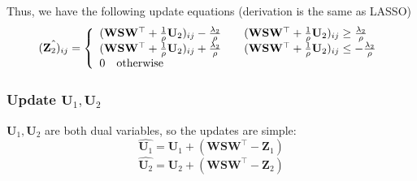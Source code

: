 \documentclass{article} %
\begin{document}
Thus, we have the following update equations (derivation is the same as LASSO)
\[ \hat{(\mathbf{Z}_2)_{ij}} = \left\{
  \begin{array}{l l l}
     (\mathbf{W}\mathbf{S}\mathbf{W}^\top+\frac{1}{\rho}\mathbf{U}_2)_{ij}-\frac{\lambda_2}{\rho}& \quad (\mathbf{W}\mathbf{S}\mathbf{W}^\top+\frac{1}{\rho}\mathbf{U}_2)_{ij} \geq \frac{\lambda_2}{\rho}\\
    (\mathbf{W}\mathbf{S}\mathbf{W}^\top+\frac{1}{\rho}\mathbf{U}_2)_{ij}+\frac{\lambda_2}{\rho} & \quad (\mathbf{W}\mathbf{S}\mathbf{W}^\top+\frac{1}{\rho}\mathbf{U}_2)_{ij} \leq -\frac{\lambda_2}{\rho}\\
    0 \quad \text{otherwise}
  \end{array} \right.\]

\subsubsection{Update $\mathbf{U}_1, \mathbf{U}_2$}
$\mathbf{U}_1, \mathbf{U}_2$ are both dual variables, so the updates are simple:
\[
\hat{\mathbf{U}_1} = \mathbf{U}_1+(\mathbf{W}\mathbf{S}\mathbf{W}^\top-\mathbf{Z}_1)
\]
\[
\hat{\mathbf{U}_2} = \mathbf{U}_2+(\mathbf{W}\mathbf{S}\mathbf{W}^\top-\mathbf{Z}_2)
\]
\end{document}

